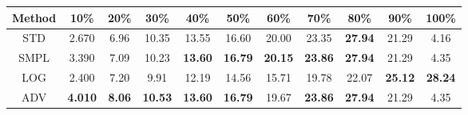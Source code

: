 \documentclass{standalone}
\begin{document}
\begin{tabular}{c|cccccccccc}
      \toprule
      Method & 10\% & 20\% & 30\% & 40\% & 50\% & 60\% & 70\% & 80\% & 90\% & 100\% \\
      \midrule
STD & 2.670 & 6.96 & 10.35 & 13.55 & 16.60 & 20.00 & 23.35 & \textbf{27.94} & 21.29 & 4.16\\
SMPL & 3.390 & 7.09 & 10.23 & \textbf{13.60} & \textbf{16.79} & \textbf{20.15} & \textbf{23.86} & \textbf{27.94} & 21.29 & 4.35\\
LOG & 2.400 & 7.20 & 9.91 & 12.19 & 14.56 & 15.71 & 19.78 & 22.07 & \textbf{25.12} & \textbf{28.24}\\
ADV & \textbf{4.010} & \textbf{8.06} & \textbf{10.53} & \textbf{13.60} & \textbf{16.79} & 19.67 & \textbf{23.86} & \textbf{27.94} & 21.29 & 4.35\\
  \bottomrule
\end{tabular}
\end{document}
